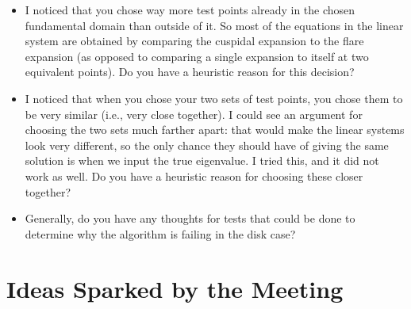 \documentclass[]{article}
\begin{document}
\begin{itemize}
	\item I noticed that you chose way more test points already in the chosen fundamental domain than outside of it.
	So most of the equations in the linear system are obtained by comparing the cuspidal expansion to the flare expansion (as opposed to comparing a single expansion to itself at two equivalent points).
	Do you have a heuristic reason for this decision?
	\item I noticed that when you chose your two sets of test points, you chose them to be very similar (i.e., very close together).
	I could see an argument for choosing the two sets much farther apart: that would make the linear systems look very different, so the only chance they should have of giving the same solution is when we input the true eigenvalue.
	I tried this, and it did not work as well.
	Do you have a heuristic reason for choosing these closer together?
	\item Generally, do you have any thoughts for tests that could be done to determine why the algorithm is failing in the disk case?
\end{itemize}

\section*{Ideas Sparked by the Meeting}
\end{document}
